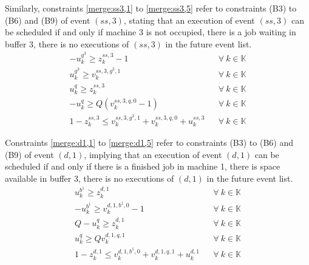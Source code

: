 \documentclass[]{interact}
\theoremstyle{plain}%
\theoremstyle{definition}
\theoremstyle{remark}
\begin{document}
Similarly, constraints \eqref{merge:ss3,1} to \eqref{merge:ss3,5} refer to constraints (B3) to (B6) and (B9) of event ${(ss,3)}$, stating that an execution of event ${(ss,3)}$ can be scheduled if and only if machine 3 is not occupied, there is a job waiting in buffer 3, there is no executions of ${(ss,3)}$ in the future event list. 
\begin{eqnarray}
-u^{g^3}_k\ge z^{ss,3}_k-1&& \forall\ k\in \mathbb{K}\label{merge:ss3,1}\\
u^{g^3}_k\ge v^{ss,3,g^3,1}_k&& \forall\ k\in \mathbb{K}\label{merge:ss3,2}\\
u^{q}_k\ge z^{ss,3}_k&& \forall\ k\in \mathbb{K}\label{merge:ss3,3}\\
-u^{q}_k \ge Q(v^{ss,3,q,0}_k-1)&& \forall\ k\in \mathbb{K}\label{merge:ss3,4}\\
1-z^{ss,3}_k\le v^{ss,3,g^3,1}_k+v^{ss,3,q,0}_k+u^{ss,3}_k&& \forall\ k\in \mathbb{K}\label{merge:ss3,5}
\end{eqnarray}

Constraints \eqref{merge:d1,1} to \eqref{merge:d1,5} refer to constraints (B3) to (B6) and (B9) of event ${(d,1)}$, implying that an execution of event ${(d,1)}$ can be scheduled if and only if there is a finished job in machine 1, there is space available in buffer 3, there is no executions of ${(d,1)}$ in the future event list. 
\begin{eqnarray}
u^{b^1}_k\ge z^{d,1}_k&& \forall\ k\in \mathbb{K}\label{merge:d1,1}\\
-u^{b^1}_k\ge v^{d,1,b^1,0}_k-1&& \forall\ k\in \mathbb{K}\label{merge:d1,2}\\
Q-u^{q}_k\ge z^{d,1}_k&& \forall\ k\in \mathbb{K}\label{merge:d1,3}\\
u^{q}_k\ge Qv^{d,1,q,1}_k&& \forall\ k\in \mathbb{K}\label{merge:d1,4}\\
1-z^{d,1}_k\le v^{d,1,b^1,0}_k+v^{d,1,q,1}_k+u^{d,1}_k&& \forall\ k\in \mathbb{K}\label{merge:d1,5}
\end{eqnarray}
\end{document}
